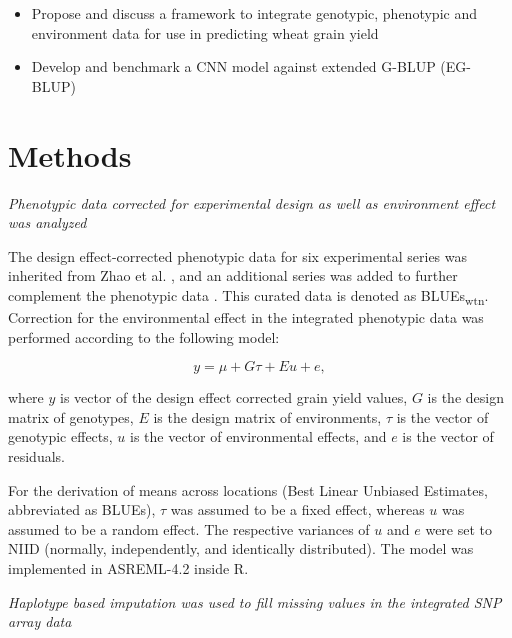 \documentclass[english, biblatex]{lni}
\begin{document}
\begin{itemize}
    \item Propose and discuss a framework to integrate genotypic, phenotypic and environment data for use in predicting wheat grain yield
    \item Develop and benchmark a CNN model against extended G-BLUP (EG-BLUP)
\end{itemize}

\section{Methods}

\textit{Phenotypic data corrected for experimental design as well as environment effect was analyzed}

The design effect-corrected phenotypic data for six experimental series was inherited from Zhao et al. \cite{zhao2021unlocking}, and an additional series was added to further complement the phenotypic data \cite{gogna_gabi_2022}. This curated data is denoted as BLUEs\textsubscript{wtn}. Correction for the environmental effect in the integrated phenotypic data was performed according to the following model:

\hspace{0.5cm}\begin{minipage}{\dimexpr\linewidth-0.5cm}
\begin{equation}
y = \mu + G\tau + Eu + e,
\end{equation}
\end{minipage}

where \(y\) is vector of the design effect corrected grain yield values, \(G\) is the design matrix of genotypes, \(E\) is the design matrix of environments, \(\tau\) is the vector of genotypic effects, \(u\) is the vector of environmental effects, and \(e\) is the vector of residuals.

For the derivation of means across locations (Best Linear Unbiased Estimates, abbreviated as BLUEs), \(\tau\) was assumed to be a fixed effect, whereas \(u\) was assumed to be a random effect. The respective variances of \(u\) and \(e\) were set to NIID (normally, independently, and identically distributed). The model was implemented in ASREML-4.2 inside R.

\textit{Haplotype based imputation was used to fill missing values in the integrated SNP array data}
\end{document}
